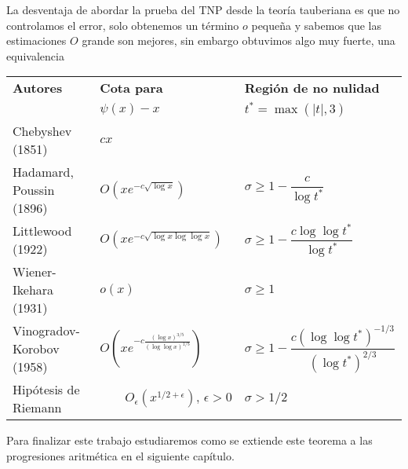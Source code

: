 \begin{note}
    La desventaja de abordar la prueba del TNP desde la teoría tauberiana es que no controlamos el error, solo obtenemos un término $o$ pequeña y sabemos que las estimaciones $O$ grande son mejores, sin embargo obtuvimos algo muy fuerte, una equivalencia

\begin{center}
    \begin{table}[h!]
\begin{tabular}{|l|l|l|}
\hline
\hspace{1.5cm}\textbf{Autores} & \hspace{1.3cm}\textbf{Cota para} & \hspace{0.2cm}\textbf{Región de no nulidad} \\
 & \hspace*{1.35cm}\textbf{$\psi(x) - x$}& \hspace{0.7cm}$t^* = \max(|t|, 3)$\\
 \hline
Chebyshev (1851) & \hspace{2.2cm}$cx$ &  \\
\hline
Hadamard, Poussin (1896) & \quad\quad$O\left( \displaystyle xe^{\displaystyle-c\sqrt{\log x}} \right)$ & $\sigma \geq 1 - \dfrac{c}{\log t^*}$ \\ \hline
Littlewood (1922) & $O\left( \displaystyle xe^{\displaystyle-c\sqrt{\log x \log \log x}} \right)$ & $\sigma \geq 1 - \dfrac{c \log \log t^*}{\log t^*}$ \\ \hline
Wiener-Ikehara (1931) & \hspace{2.05cm}$o(x)$ & $\sigma \geq 1$ \\ \hline
Vinogradov-Korobov (1958) &\hspace{0.16cm} $O\left( xe^{-c \displaystyle\frac{(\log x)^{3/5}}{(\log \log x)^{1/5}}} \right)$ & $\sigma \geq 1 - \dfrac{c (\log \log t^*)^{-1/3}}{(\log t^*)^{2/3}}$ \\ \hline
Hipótesis de Riemann & $\displaystyle \quad\quad O_\epsilon(x^{1/2+\epsilon}), \, \epsilon > 0$ & $\sigma > 1/2$ \\ \hline
\end{tabular}
\end{table}
\end{center}
\end{note}

Para finalizar este trabajo estudiaremos como se extiende este teorema a las progresiones aritmética en el siguiente capítulo.